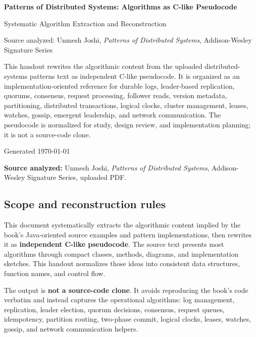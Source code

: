 \documentclass[10pt,letterpaper]{article}
\newcommand{\handouttitle}{Patterns of Distributed Systems: Algorithms as C-like Pseudocode}
\begin{document}
\begin{titlepage}
\centering
\vspace*{0.85in}
{\Huge\bfseries\color{HouseBlue}\handouttitle\par}
\vspace{0.22in}
{\Large Systematic Algorithm Extraction and Reconstruction\par}
\vspace{0.34in}
{\large Source analyzed: Unmesh Joshi, \emph{Patterns of Distributed Systems}, Addison-Wesley Signature Series\par}
\vfill
\begin{minipage}{0.88\textwidth}
\small
This handout rewrites the algorithmic content from the uploaded distributed-systems patterns text as independent C-like pseudocode. It is organized as an implementation-oriented reference for durable logs, leader-based replication, quorums, consensus, request processing, follower reads, version metadata, partitioning, distributed transactions, logical clocks, cluster management, leases, watches, gossip, emergent leadership, and network communication. The pseudocode is normalized for study, design review, and implementation planning; it is not a source-code clone.
\end{minipage}
\vfill
{\large Generated \today\par}
\end{titlepage}
\clearpage
{}
\tableofcontents
\clearpage
{}


\textbf{Source analyzed:} Unmesh Joshi, \emph{Patterns of Distributed Systems}, Addison-Wesley Signature Series, uploaded PDF.

\subsection*{Scope and reconstruction rules}

This document systematically extracts the algorithmic content implied by the book's Java-oriented source examples and pattern implementations, then rewrites it as \textbf{independent C-like pseudocode}. The source text presents most algorithms through compact classes, methods, diagrams, and implementation sketches. This handout normalizes those ideas into consistent data structures, function names, and control flow.

The output is \textbf{not a source-code clone}. It avoids reproducing the book's code verbatim and instead captures the operational algorithms: log management, replication, leader election, quorum decisions, consensus, request queues, idempotency, partition routing, two-phase commit, logical clocks, leases, watches, gossip, and network communication helpers.
\end{document}
